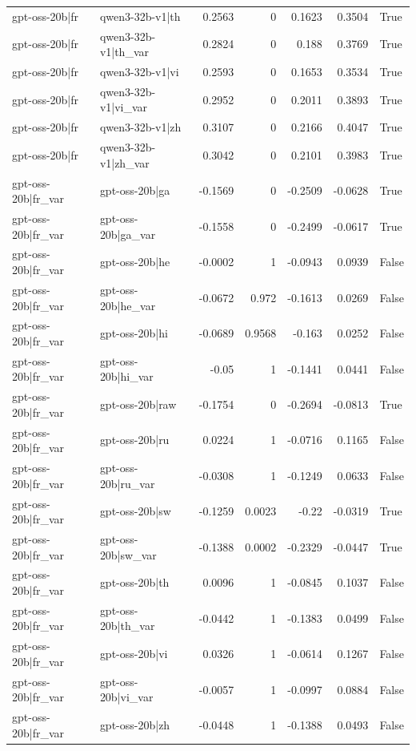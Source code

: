 \begin{table}
\begin{tabular}{l l r r r r l}
gpt-oss-20b|fr & qwen3-32b-v1|th & 0.2563 & 0 & 0.1623 & 0.3504 & True \\
gpt-oss-20b|fr & qwen3-32b-v1|th_var & 0.2824 & 0 & 0.188 & 0.3769 & True \\
gpt-oss-20b|fr & qwen3-32b-v1|vi & 0.2593 & 0 & 0.1653 & 0.3534 & True \\
gpt-oss-20b|fr & qwen3-32b-v1|vi_var & 0.2952 & 0 & 0.2011 & 0.3893 & True \\
gpt-oss-20b|fr & qwen3-32b-v1|zh & 0.3107 & 0 & 0.2166 & 0.4047 & True \\
gpt-oss-20b|fr & qwen3-32b-v1|zh_var & 0.3042 & 0 & 0.2101 & 0.3983 & True \\
gpt-oss-20b|fr_var & gpt-oss-20b|ga & -0.1569 & 0 & -0.2509 & -0.0628 & True \\
gpt-oss-20b|fr_var & gpt-oss-20b|ga_var & -0.1558 & 0 & -0.2499 & -0.0617 & True \\
gpt-oss-20b|fr_var & gpt-oss-20b|he & -0.0002 & 1 & -0.0943 & 0.0939 & False \\
gpt-oss-20b|fr_var & gpt-oss-20b|he_var & -0.0672 & 0.972 & -0.1613 & 0.0269 & False \\
gpt-oss-20b|fr_var & gpt-oss-20b|hi & -0.0689 & 0.9568 & -0.163 & 0.0252 & False \\
gpt-oss-20b|fr_var & gpt-oss-20b|hi_var & -0.05 & 1 & -0.1441 & 0.0441 & False \\
gpt-oss-20b|fr_var & gpt-oss-20b|raw & -0.1754 & 0 & -0.2694 & -0.0813 & True \\
gpt-oss-20b|fr_var & gpt-oss-20b|ru & 0.0224 & 1 & -0.0716 & 0.1165 & False \\
gpt-oss-20b|fr_var & gpt-oss-20b|ru_var & -0.0308 & 1 & -0.1249 & 0.0633 & False \\
gpt-oss-20b|fr_var & gpt-oss-20b|sw & -0.1259 & 0.0023 & -0.22 & -0.0319 & True \\
gpt-oss-20b|fr_var & gpt-oss-20b|sw_var & -0.1388 & 0.0002 & -0.2329 & -0.0447 & True \\
gpt-oss-20b|fr_var & gpt-oss-20b|th & 0.0096 & 1 & -0.0845 & 0.1037 & False \\
gpt-oss-20b|fr_var & gpt-oss-20b|th_var & -0.0442 & 1 & -0.1383 & 0.0499 & False \\
gpt-oss-20b|fr_var & gpt-oss-20b|vi & 0.0326 & 1 & -0.0614 & 0.1267 & False \\
gpt-oss-20b|fr_var & gpt-oss-20b|vi_var & -0.0057 & 1 & -0.0997 & 0.0884 & False \\
gpt-oss-20b|fr_var & gpt-oss-20b|zh & -0.0448 & 1 & -0.1388 & 0.0493 & False \\

\end{tabular}
\end{table}
